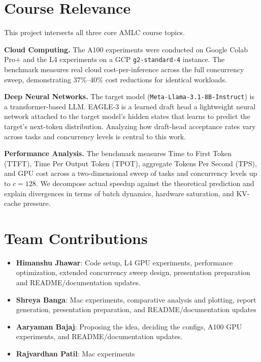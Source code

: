 \documentclass[10pt,twocolumn]{article}
\begin{document}
\section{Course Relevance}
\label{sec:course}

This project intersects all three core AMLC course topics.

\textbf{Cloud Computing.}  The A100 experiments were conducted on Google Colab
Pro+ and the L4 experiments on a GCP \texttt{g2-standard-4} instance.  The benchmark measures real cloud cost-per-inference across the full
concurrency sweep, demonstrating 37\%--40\% cost reductions for identical workloads.


\textbf{Deep Neural Networks.}  The target model
(\texttt{Meta-Llama-3.1-8B-Instruct}) is a transformer-based LLM.  EAGLE-3 is a
learned draft head a lightweight neural network attached to the target model's
hidden states that learns to predict the target's next-token distribution.
Analyzing how draft-head acceptance rates vary across tasks and concurrency levels is central to this work.

\textbf{Performance Analysis.}  The benchmark measures Time to First Token (TTFT),
Time Per Output Token (TPOT), aggregate Tokens Per Second (TPS), and GPU cost
across a two-dimensional sweep of tasks and concurrency levels up to $c=128$.  We
decompose actual speedup against the theoretical prediction and explain divergences in terms
of batch dynamics, hardware saturation, and KV-cache pressure. 

\section{Team Contributions}

\begin{itemize}[leftmargin=1.2em,itemsep=2pt,topsep=2pt]
\item \textbf{Himanshu Jhawar}: Code setup, L4 GPU experiments, performance optimization, extended concurrency sweep design, presentation preparation and README/documentation updates.
\item \textbf{Shreya Banga}: Mac experiments, comparative analysis and plotting, report generation, presentation preparation, and README/documentation updates
\item \textbf{Aaryaman Bajaj}: Proposing the idea, deciding the configs, A100 GPU experiments, and README/documentation updates.    
\item \textbf{Rajvardhan Patil}: Mac experiments
\end{itemize}
\end{document}
